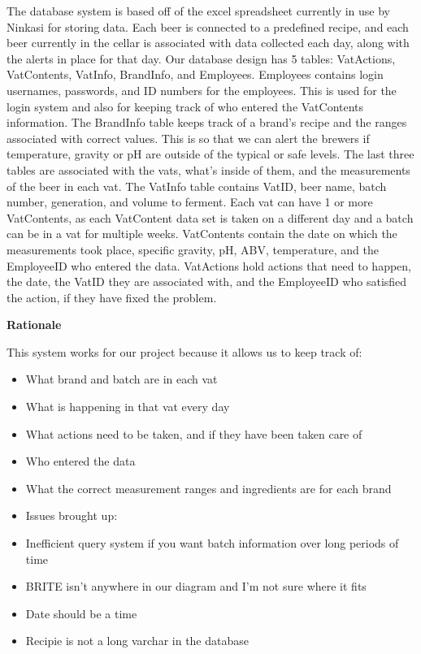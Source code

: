 \documentclass[draftclsnofoot,onecolumn,letterpaper,10pt]{IEEEtran}
\begin{document}
			The database system is based off of the excel spreadsheet currently in use by Ninkasi for storing data.
			Each beer is connected to a predefined recipe, and each beer currently in the cellar is associated with data collected each day, along with the alerts in place for that day.
			Our database design has 5 tables: VatActions, VatContents, VatInfo, BrandInfo, and Employees.
			Employees contains login usernames, passwords, and ID numbers for the employees.
			This is used for the login system and also for keeping track of who entered the VatContents information.
			The BrandInfo table keeps track of a brand’s recipe and the ranges associated with correct values.
			This is so that we can alert the brewers if temperature, gravity or pH are outside of the typical or safe levels.
			The last three tables are associated with the vats, what’s inside of them, and the measurements of the beer in each vat.
			The VatInfo table contains VatID, beer name, batch number, generation, and volume to ferment.
			Each vat can have 1 or more VatContents, as each VatContent data set is taken on a different day and a batch can be in a vat for multiple weeks.
			VatContents contain the date on which the measurements took place, specific gravity, pH, ABV, temperature, and the EmployeeID who entered the data.
			VatActions hold actions that need to happen, the date, the VatID they are associated with, and the EmployeeID who satisfied the action, if they have fixed the problem.


			\textbf{Rationale}

			This system works for our project because it allows us to keep track of:

			\begin{itemize}
				\item What brand and batch are in each vat
				\item What is happening in that vat every day
				\item What actions need to be taken, and if they have been taken care of
				\item Who entered the data
				\item What the correct measurement ranges and ingredients are for each brand
			\end{itemize}

			\begin{itemize}
				\item Issues brought up:
				\item Inefficient query system if you want batch information over long periods of time
				\item BRITE isn’t anywhere in our diagram and I’m not sure where it fits
				\item Date should be a time
				\item Recipie is not a long varchar in the database
			\end{itemize}
\end{document}
